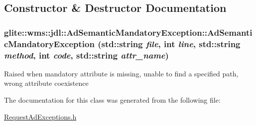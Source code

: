 \subsection{Constructor \& Destructor Documentation}
\hypertarget{classglite_1_1wms_1_1jdl_1_1AdSemanticMandatoryException_a0}{
\subsubsection[AdSemanticMandatoryException]{\setlength{\rightskip}{0pt plus 5cm}glite::wms::jdl::Ad\-Semantic\-Mandatory\-Exception::Ad\-Semantic\-Mandatory\-Exception (std::string {\em file}, int {\em line}, std::string {\em method}, int {\em code}, std::string {\em attr\_\-name})}}
\label{classglite_1_1wms_1_1jdl_1_1AdSemanticMandatoryException_a0}


Raised when mandatory attribute is missing, unable to find a specified path, wrong attribute coexistence 

The documentation for this class was generated from the following file:\begin{CompactItemize}
\item 
\hyperlink{RequestAdExceptions_8h}{Request\-Ad\-Exceptions.h}\end{CompactItemize}

